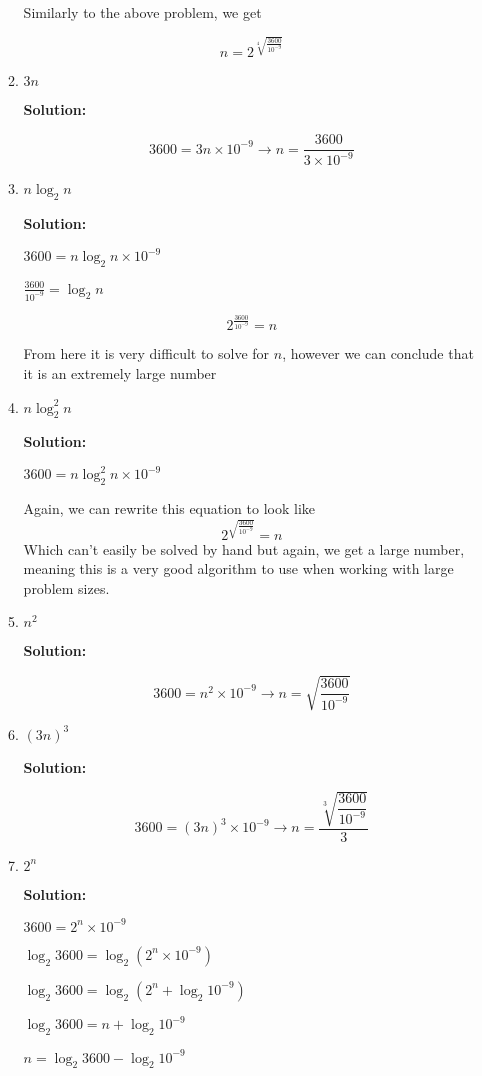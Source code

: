 \documentclass[11pt]{article}
\begin{document}
\begin{enumerate}
\begin{enumerate}
Similarly to the above problem, we get

$$n = 2^{\sqrt[4]{\frac{3600}{10^{-9}}}}$$

\item $3n$

\textbf{Solution: }

$$3600 = 3n \times 10^{-9} \longrightarrow n = \dfrac{3600}{3 \times 10^{-9}}$$

\item $n\log_2 n$

\textbf{Solution: }

$3600 = n\log_2 n \times 10^{-9}$

$\frac{3600}{10^{-9}} = \log_2 n$

$$ 2^{\frac{3600}{10^{-9}}} = n $$

From here it is very difficult to solve for $n$, however we can conclude that it is an extremely large number

\item $n\log^2_2 n$

\textbf{Solution: }

$3600 = n\log^2_2 n \times 10^{-9}$

Again, we can rewrite this equation to look like 
$$ 2^{\sqrt{\frac{3600}{10^{-9}}}} = n $$
Which can't easily be solved by hand but again, we get a large number, meaning this is a very good algorithm to use when working with large problem sizes.  

\item $n^2$

\textbf{Solution: }

$$3600 = n^2 \times 10^{-9} \longrightarrow n = \sqrt{\dfrac{3600}{10^{-9}}}$$

\item $(3n)^3$

\textbf{Solution: }

$$3600 = (3n)^3 \times 10^{-9} \longrightarrow n = \dfrac{\sqrt[3]{\dfrac{3600}{10^{-9}}}}{3}$$

\item $2^n$

\textbf{Solution: }

$3600 = 2^n \times 10^{-9}$

$\log_2{3600} = \log_2{(2^n \times 10^{-9})}$

$\log_2{3600} = \log_2{(2^n + \log_2 10^{-9})}$

$\log_2{3600} = n + \log_2{10^{-9}}$

$n = \log_2 3600 - \log_2{10^{-9}}$


\end{enumerate}
\end{enumerate}
\end{document}
